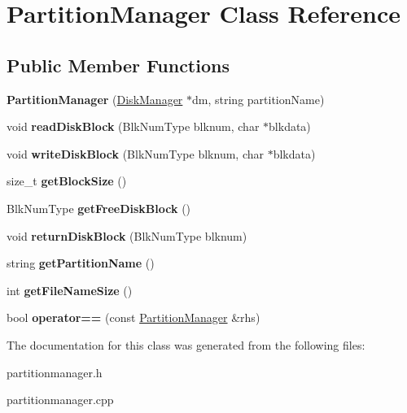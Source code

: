 \hypertarget{classPartitionManager}{}\section{Partition\+Manager Class Reference}
\label{classPartitionManager}
\subsection*{Public Member Functions}
\begin{DoxyCompactItemize}
\item 
\mbox{\label{classPartitionManager_aa875b0b19b7ab9f32b02d2c9be383b75}} 
{\bfseries Partition\+Manager} (\mbox{\hyperlink{classDiskManager}{Disk\+Manager}} $\ast$dm, string partition\+Name)
\item 
\mbox{\label{classPartitionManager_a7aca34c24770b7b9290c489475655ada}} 
void {\bfseries read\+Disk\+Block} (Blk\+Num\+Type blknum, char $\ast$blkdata)
\item 
\mbox{\label{classPartitionManager_a114d5d4f8d90b6e9207b09d99e246bed}} 
void {\bfseries write\+Disk\+Block} (Blk\+Num\+Type blknum, char $\ast$blkdata)
\item 
\mbox{\label{classPartitionManager_aa1026e17e77f154d7034fafd188bda02}} 
size\+\_\+t {\bfseries get\+Block\+Size} ()
\item 
\mbox{\label{classPartitionManager_a682ce5963a31cf7009455cb1c229b26a}} 
Blk\+Num\+Type {\bfseries get\+Free\+Disk\+Block} ()
\item 
\mbox{\label{classPartitionManager_a3ce9b50aa5e7d9063919fc55d125246b}} 
void {\bfseries return\+Disk\+Block} (Blk\+Num\+Type blknum)
\item 
\mbox{\label{classPartitionManager_a7c756dba2665e5a7b62b2ccb261f1158}} 
string {\bfseries get\+Partition\+Name} ()
\item 
\mbox{\label{classPartitionManager_a5bd37532cafac27e5b77fe1b58322412}} 
int {\bfseries get\+File\+Name\+Size} ()
\item 
\mbox{\label{classPartitionManager_a8f19809bbfe06885d476fa0ac4632243}} 
bool {\bfseries operator==} (const \mbox{\hyperlink{classPartitionManager}{Partition\+Manager}} \&rhs)
\end{DoxyCompactItemize}


The documentation for this class was generated from the following files\+:\begin{DoxyCompactItemize}
\item 
partitionmanager.\+h\item 
partitionmanager.\+cpp\end{DoxyCompactItemize}
